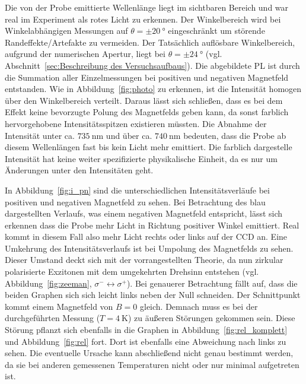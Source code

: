 Die von der Probe emittierte Wellenlänge liegt im sichtbaren Bereich und war real im Experiment als rotes Licht zu erkennen.
Der Winkelbereich wird bei Winkelabhängigen Messungen auf $\theta = \pm \SI{20}{\degree}$ 
eingeschränkt um störende Randeffekte/Artefakte zu vermeiden. 
Der Tatsächlich auflösbare Winkelbereich, aufgrund der numerischen Apertur, liegt bei $\theta = \pm \SI{24}{\degree}$ 
(vgl. Abschnitt~\ref{sec:Beschreibung des Versuchsaufbaus}).
Die abgebildete PL ist durch die Summation aller Einzelmessungen 
bei positiven und negativen Magnetfeld entstanden. 
Wie in Abbildung~\ref{fig:photo} zu erkennen, ist die Intensität homogen über den Winkelbereich verteilt.
Daraus lässt sich schließen, dass es bei dem Effekt keine bevorzugte Polung des Magnetfelds
geben kann, da sonst farblich hervorgehobene Intensitätsspitzen existieren müssten. 
Die Abnahme der Intensität unter ca. $\SI{735}{\nano\meter}$ und über ca. 
$\SI{740}{\nano\meter}$ bedeuten, dass die Probe ab diesem Wellenlängen fast bis kein Licht mehr emittiert.
Die farblich dargestelle Intensität hat keine weiter spezifizierte physikalische Einheit, da es nur um Änderungen unter
den Intensitäten geht.

In Abbildung~\ref{fig:i_pn} sind die unterschiedlichen Intensitätsverläufe bei positiven und negativen
Magnetfeld zu sehen. 
Bei Betrachtung des blau dargestellten Verlaufs, was einem negativen Magnetfeld
entspricht, lässt sich erkennen dass die Probe mehr Licht in Richtung positiver Winkel emittiert.
Real kommt in diesem Fall also mehr Licht rechts oder links auf der CCD an.
Eine Umkehrung des Intensitätsverlaufs ist bei Umpolung des Magnetfelds zu sehen.
Dieser Umstand deckt sich mit der vorrangestellten Theorie, da nun zirkular polarisierte Exzitonen mit dem 
umgekehrten Drehsinn entstehen (vgl. Abbildung~\ref{fig:zeeman}, $\sigma^- \leftrightarrow \sigma^+$).
Bei genauerer Betrachtung fällt auf, dass die  beiden Graphen sich sich leicht links neben der Null schneiden.
Der Schnittpunkt kommt einem Magnetfeld von $B = 0$ gleich. 
Demnach muss es bei der durchgeführten Messung ($T = \SI{4}{\kelvin}$) zu äußeren Störungen gekommen sein.
Diese Störung pflanzt sich ebenfalls in die Graphen in  Abbildung~\ref{fig:rel_komplett} 
und  Abbildung~\ref{fig:rel} fort.
Dort ist ebenfalls eine Abweichung nach links zu sehen.
Die eventuelle Ursache kann abschließend nicht genau bestimmt werden, da sie bei anderen gemessenen 
Temperaturen nicht oder nur minimal aufgetreten ist.

